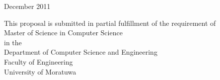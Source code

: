 \begin{titlepage}
\begin{center}
\begin{center}
\end{center}

\begin{center}
\vfill
December 2011\\
\end{center}

\vfill
\begin{center}
This proposal is submitted in partial fulfillment of the requirement of\\
Master of Science in Computer Science\\
in the\\
Department of Computer Science and Engineering\\
Faculty of Engineering\\
University of Moratuwa\\
\end{center}
\vfill

\end{center}

\end{titlepage}